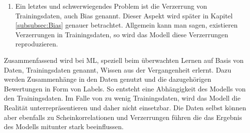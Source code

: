 \begin{onehalfspace}
\begin{enumerate}
\begin{figure}[h]
                \label{fig:Scheinkorrelation}
            \end{figure} \\
            Ein Beispiel dafür ist in Abbildung \ref*{fig:Scheinkorrelation} zu sehen. In der ein Pferdebild nicht anhand der Kontur des Pferdes, sondern anhand des Wasserzeichens in dem Bild erkannt wurde. Grund dafür war, dass einige der Trainingsdaten dieses Wasserzeichen beinhaltet haben und das Modell daraus eine Scheinkorrelation erlernt hat.\cite{Horn2022}\cite{Lapuschkin2016}\cite{Cremers2019}
            \item Ein letztes und schwerwiegendes Problem ist die Verzerrung von Trainingsdaten, auch Bias genannt. Dieser Aspekt wird später in Kapitel \ref*{subsubsec:Bias} genauer betrachtet. Allgemein kann man sagen, existieren Verzerrungen in Trainingsdaten, so wird das Modell diese Verzerrungen reproduzieren.\cite{Cremers2019}
        \end{enumerate}
        Zusammenfassend wird bei \ac*{ML}, speziell beim überwachten Lernen auf Basis von Daten, Trainingsdaten genannt, Wissen aus der Vergangenheit erlernt. Dazu werden Zusammenhänge in den Daten genutzt und die dazugehörigen Bewertungen in Form von Labels. So entsteht eine Abhängigkeit des Modells von den Trainingsdaten. Im Falle von zu wenig Trainingsdaten, wird das Modell die Realität unterrepräsentieren und daher nicht einsetzbar. Die Daten selbst können aber ebenfalls zu Scheinkorrelationen und Verzerrungen führen die das Ergebnis des Modells mitunter stark beeinflussen.\cite{Cremers2019}
 
    \newpage

\end{onehalfspace}
